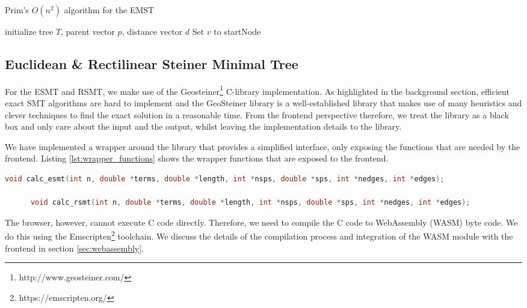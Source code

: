 \documentclass{l4proj}
\begin{document}
\begin{algorithm}
    \caption{Prim's $O(n^2)$ algorithm for the EMST}
    \label{alg:emst}
    \SetAlgoLined
    initialize tree $T$, parent vector $p$, distance vector $d$\;
    Set $v$ to startNode\;
    \;
\end{algorithm}

\subsection{Euclidean \& Rectilinear Steiner Minimal Tree}
For the ESMT and RSMT, we make use of the Geosteiner\footnote{http://www.geosteiner.com/} C-library implementation. As highlighted in the background section, efficient exact SMT algorithms are hard to implement and the GeoSteiner library is a well-established library that makes use of many heuristics and clever techniques to find the exact solution in a reasonable time.
From the frontend perspective therefore, we treat the library as a black box and only care about the input and the output, whilst leaving the implementation details to the library.

We have implemented a wrapper around the library that provides a simplified interface, only exposing the functions that are needed by the frontend. Listing \ref{lst:wrapper_functions} shows the wrapper functions that are exposed to the frontend.

\begin{lstlisting}[language=C,caption=Wrapper functions for the Geosteiner library,label=lst:wrapper_functions]
      void calc_esmt(int n, double *terms, double *length, int *nsps, double *sps, int *nedges, int *edges);

      void calc_rsmt(int n, double *terms, double *length, int *nsps, double *sps, int *nedges, int *edges);
\end{lstlisting}

The browser, however, cannot execute C code directly. Therefore, we need to compile the C code to WebAssembly (WASM) byte code. We do this using the Emscripten\footnote{https://emscripten.org/} toolchain.
We discuss the details of the compilation process and integration of the WASM module with the frontend in section \ref{sec:webassembly}.
\end{document}

